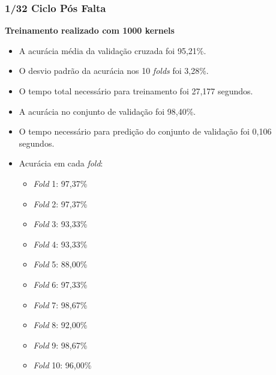 \subsubsection{1/32 Ciclo Pós Falta}
\textbf{Treinamento realizado com 1000 kernels}
\begin{itemize}
    \item A acurácia média da validação cruzada foi 95,21\%.
    \item O desvio padrão da acurácia nos 10 \textit{folds} foi 3,28\%.
    \item O tempo total necessário para treinamento foi 27,177 segundos.
    \item A acurácia no conjunto de validação foi 98,40\%.
    \item O tempo necessário para predição do conjunto de validação foi 0,106 segundos.
    \item Acurácia em cada \textit{fold}:
    \begin{itemize}
        \item \textit{Fold} 1: 97,37\%
        \item \textit{Fold} 2: 97,37\%
        \item \textit{Fold} 3: 93,33\%
        \item \textit{Fold} 4: 93,33\%
        \item \textit{Fold} 5: 88,00\%
        \item \textit{Fold} 6: 97,33\%
        \item \textit{Fold} 7: 98,67\%
        \item \textit{Fold} 8: 92,00\%
        \item \textit{Fold} 9: 98,67\%
        \item \textit{Fold} 10: 96,00\%
    \end{itemize}
\end{itemize}

